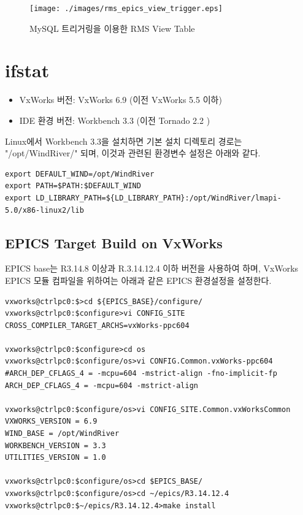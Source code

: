 \documentclass[11pt
  , a4paper
  , article
  , oneside
]{memoir}
\begin{document}
\begin{figure}[h!]
	\centering
	\texttt{[image: ./images/rms\_epics\_view\_trigger.eps]}
	\caption{MySQL 트리거링을 이용한 RMS View Table}
	\label{fig:rms_epics_view_trigger}
\end{figure}

\clearpage

\chapter{ifstat}



\begin{itemize}
	\item VxWorks 버전: VxWorks 6.9 (이전 VxWorks 5.5 이하)
	\item IDE 환경 버전: Workbench 3.3 (이전 Tornado 2.2 )
\end{itemize}

Linux에서 Workbench 3.3을 설치하면 기본 설치 디렉토리 경로는 "/opt/WindRiver/" 되며, 이것과 관련된 환경변수 설정은 아래와 같다.

\begin{lstlisting}[style=termstyle]
export DEFAULT_WIND=/opt/WindRiver
export PATH=$PATH:$DEFAULT_WIND
export LD_LIBRARY_PATH=${LD_LIBRARY_PATH}:/opt/WindRiver/lmapi-5.0/x86-linux2/lib
\end{lstlisting}

\section{EPICS Target Build on VxWorks}
EPICS base는 R3.14.8 이상과 R.3.14.12.4 이하 버전을 사용하여 하며, VxWorks EPICS 모듈 컴파일을 위하여는 아래과 같은 EPICS 환경설정을 설정한다.

\begin{lstlisting}[style=termstyle]
vxworks@ctrlpc0:$>cd ${EPICS_BASE}/configure/
vxworks@ctrlpc0:$configure>vi CONFIG_SITE
CROSS_COMPILER_TARGET_ARCHS=vxWorks-ppc604

vxworks@ctrlpc0:$configure>cd os
vxworks@ctrlpc0:$configure/os>vi CONFIG.Common.vxWorks-ppc604
#ARCH_DEP_CFLAGS_4 = -mcpu=604 -mstrict-align -fno-implicit-fp
ARCH_DEP_CFLAGS_4 = -mcpu=604 -mstrict-align

vxworks@ctrlpc0:$configure/os>vi CONFIG_SITE.Common.vxWorksCommon
VXWORKS_VERSION = 6.9
WIND_BASE = /opt/WindRiver
WORKBENCH_VERSION = 3.3
UTILITIES_VERSION = 1.0

vxworks@ctrlpc0:$configure/os>cd $EPICS_BASE/
vxworks@ctrlpc0:$configure/os>cd ~/epics/R3.14.12.4
vxworks@ctrlpc0:$~/epics/R3.14.12.4>make install
\end{lstlisting}
\end{document}
